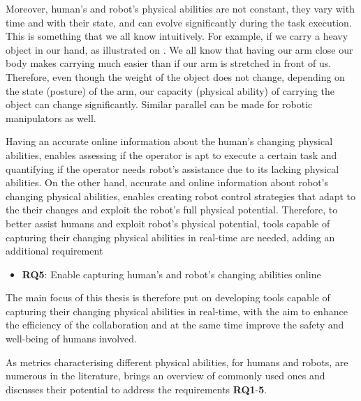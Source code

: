 Moreover, human's and robot's physical abilities are not constant, they vary with time and with their state, and can evolve significantly during the task execution.
This is something that we all know intuitively. For example, if we carry a heavy object in our hand, as illustrated on . We all know that having our arm close our body makes carrying much easier than if our arm is stretched in front of us. Therefore, even though the weight of the object does not change, depending on the state (posture) of the arm, our capacity (physical ability) of carrying the object can change significantly. Similar parallel can be made for robotic manipulators as well.  

Having an accurate online information about the human's changing physical abilities, enables assessing if the operator is apt to execute a certain task and quantifying if the operator needs robot's assistance due to its lacking physical abilities. On the other hand, accurate and online information about robot's changing physical abilities, enables creating robot control strategies that adapt to the their changes and exploit the robot's full physical potential. Therefore, to better assist humans and exploit robot's physical potential, tools capable of capturing their changing physical abilities in real-time are needed, adding an additional requirement
\begin{itemize}
    \item \textbf{RQ5}: Enable capturing human's and robot's changing abilities online
\end{itemize}

The main focus of this thesis is therefore put on developing tools capable of capturing their changing physical abilities in real-time, with the aim to enhance the efficiency of the collaboration and at the same time improve the safety and well-being of humans involved. 

As metrics characterising different physical abilities, for humans and robots, are numerous in the literature,  brings an overview of commonly used ones and discusses their potential to address the requirements \textbf{RQ1}-\textbf{5}.


